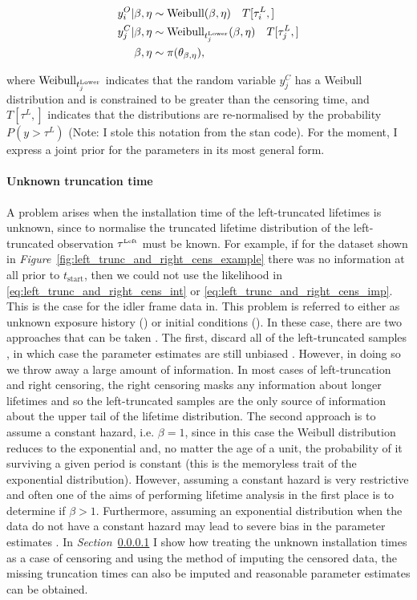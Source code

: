 \begin{align*}
    y^O_i|\beta, \eta & \sim \hbox{Weibull}(\beta, \eta) \quad T[\tau^L_i, ]\\
    y^C_j|\beta, \eta & \sim \hbox{Weibull}_{t^{\hbox{\tiny{Lower}}}_j}(\beta, \eta) \quad T[\tau^L_j, ] \\
    \beta, \eta & \sim \pi(\theta_{\beta, \eta}),
\end{align*}

\noindent where $\hbox{Weibull}_{t^{\hbox{\tiny{Lower}}}_j}$ indicates that the random variable $y^C_j$ has a Weibull distribution and is constrained to be greater than the censoring time, and $T[\tau^L, ]$ indicates that the distributions are re-normalised by the probability $P(y > \tau^L)$ (Note: I stole this notation from the stan code). For the moment, I express a joint prior for the parameters in its most general form.

\paragraph{Unknown truncation time}

A problem arises when the installation time of the left-truncated lifetimes is unknown, since to normalise the truncated lifetime distribution of the left-truncated observation $\tau^{\hbox{\tiny{Left}}}$ must be known. For example, if for the dataset shown in \textit{Figure}~\ref{fig:left_trunc_and_right_cens_example} there was no information at all prior to $t_\text{start}$, then we could not use the likelihood in \ref{eq:left_trunc_and_right_cens_int} or \ref{eq:left_trunc_and_right_cens_imp}. This is the case for the idler frame data in. This problem is referred to either as unknown exposure history () or initial conditions (). In these case, there are two approaches that can be taken \citep{guo1993}. The first, discard all of the left-truncated samples \citep{}, in which case the parameter estimates are still unbiased \citep{}. However, in doing so we throw away a large amount of information. In most cases of left-truncation and right censoring, the right censoring masks any information about longer lifetimes and so the left-truncated samples are the only source of information about the upper tail of the lifetime distribution. The second approach is to assume a constant hazard, i.e. $\beta = 1$, since in this case the Weibull distribution reduces to the exponential and, no matter the age of a unit, the probability of it surviving a given period is constant (this is the memoryless trait of the exponential distribution). However, assuming a constant hazard is very restrictive and often one of the aims of performing lifetime analysis in the first place is to determine if $\beta > 1$. Furthermore, assuming an exponential distribution when the data do not have a constant hazard may lead to severe bias in the parameter estimates \citep{heckman1986}. In \textit{Section}~\ref{}
I show how treating the unknown installation times as a case of censoring and using the method of imputing the censored data, the missing truncation times can also be imputed and reasonable parameter estimates can be obtained.

